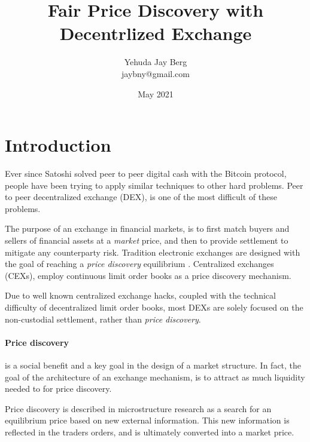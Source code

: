 \documentclass[12pt]{article}
\title{Fair Price Discovery with Decentrlized Exchange}
\author{Yehuda Jay Berg \\jaybny@gmail.com}
\date{May 2021}
\begin{document}
\parindent 0cm
\parskip   6pt
\maketitle




\begin{abstract}
\end{abstract}

\section{Introduction}
Ever since Satoshi solved peer to peer digital cash with the Bitcoin protocol, people have been trying to apply similar techniques to other hard problems. Peer to peer decentralized exchange (DEX), is one of the most difficult of these problems. 

The purpose of an exchange in financial markets, is to first match buyers and sellers of financial assets at a \emph{market} price, and then to provide settlement to mitigate any counterparty risk. Tradition electronic exchanges are designed with the goal of reaching a  \emph{price discovery} equilibrium \cite{francioni_schwartz_2017}. Centralized exchanges (CEXs), employ continuous limit order books as a price discovery mechanism. 

Due to well known centralized exchange hacks, coupled with the technical difficulty of decentralized limit order books, most DEXs are solely focused on the non-custodial settlement, rather than \emph{price discovery}. 

\paragraph*{Price discovery} is a social benefit and a key goal in the design of a market structure. In fact, the goal of the architecture of an exchange mechanism, is to attract as much liquidity needed to for price discovery.  \cite{francioni_schwartz_2017}

Price discovery is described in microstructure research as a search for an equilibrium price based on new external information. This new information is reflected in the traders orders, and is ultimately converted into a market price. \citep{RePEc:nbr:nberwo:6257}
\end{document}
